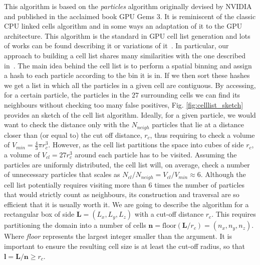 \documentclass[twoside,openright,titlepage,numbers=noenddot,%
headinclude,footinclude,cleardoublepage=empty,abstract=on,
BCOR=5mm,fontsize=11pt, dvipsnames, paper=b5
]{scrreprt}
\renewcommand{\vec}[1]{\bm{#1}}
\newcommand{\gpu}{\gls{GPU}\xspace}
\begin{document}
This algorithm is based on the \emph{particles} algorithm originally devised by NVIDIA and published in the acclaimed book GPU Gems 3\cite{Nguyen2008}. It is reminiscent of the classic CPU linked cells algorithm\cite{Allen2017} and in some ways an adaptation of it to the \gpu architecture. This algorithm is the standard in \gls{GPU} cell list generation and lots of works can be found describing it or variations of it~\cite{Anderson2008}\cite{Dominguez2011}\cite{Howard2016}\cite{Brown2011}. In particular, our approach to building a cell list shares many similarities with the one described in~\cite{Tang2014}.
The main idea behind the cell list is to perform a spatial binning and assign a hash to each particle according to the bin it is in. If we then sort these hashes we get a list in which all the particles in a given cell are contiguous. By accessing, for a certain particle, the particles in the $27$ surrounding cells we can find its neighbours without checking too many false positives, Fig. \ref{fig:celllist_sketch} provides an sketch of the cell list algorithm. Ideally, for a given particle, we would want to check the distance only with the $N_{neigh}$ particles that lie at a distance closer than (or equal to) the cut off distance, $r_{c}$, thus requiring to check a volume of $V_{min}=\frac{4}{3}\pi r_{c}^3$. However, as the cell list partitions the space into cubes of side $r_{c}$, a volume of $V_{cl} = 27r_{c}^3$ around each particle has to be visited.
Assuming the particles are uniformly distributed, the cell list will, on average, check a number of unnecessary particles that scales as $N_{cl}/N_{neigh} = V_{cl}/V_{min} \approx 6$. Although the cell list potentially requires visiting more than $6$ times the number of particles that would strictly count as neighbours, its construction and traversal are so efficient that it is usually worth it.
We are going to describe the algorithm for a rectangular box of side $\vec{L}=(L_x, L_y, L_z)$ with a cut-off distance $r_{c}$. This requires partitioning the domain into a number of cells $\vec{n}=\textrm{floor}(\vec{L}/r_{c}) = (n_x, n_y, n_z)$. Where \emph{floor} represents the largest integer smaller than the argument. It is important to ensure the resulting cell size is at least the cut-off radius, so that $\vec{l} = \vec{L}/\vec{n} \ge r_{c}$.
\end{document}
